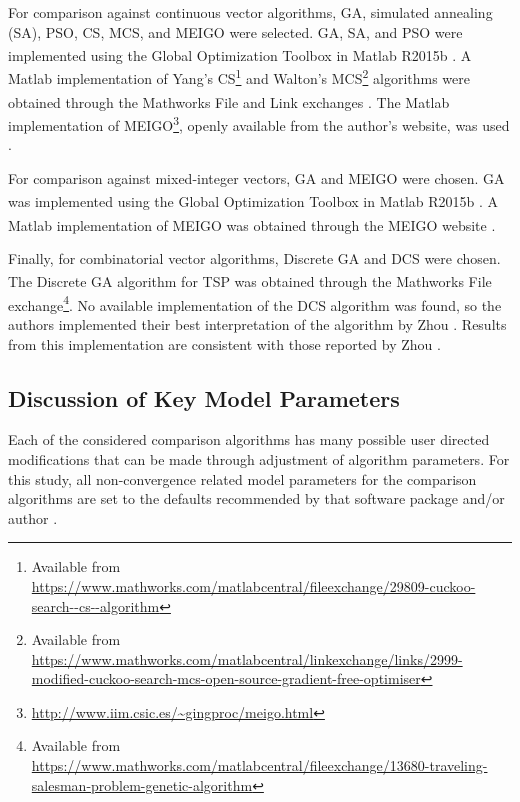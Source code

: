 \documentclass{article}                                                                           %
\begin{document}
For comparison against continuous vector algorithms, GA, simulated annealing (SA), PSO, CS, MCS, and MEIGO were selected.  
GA, SA, and PSO were implemented using the Global Optimization Toolbox in Matlab\textsuperscript{\textregistered} R2015b \cite{Mathworks2015}.
A Matlab\textsuperscript{\textregistered} implementation of Yang's CS\footnote{Available from \url{https://www.mathworks.com/matlabcentral/fileexchange/29809-cuckoo-search--cs--algorithm}} and Walton's MCS\footnote{Available from \url{https://www.mathworks.com/matlabcentral/linkexchange/links/2999-modified-cuckoo-search-mcs-open-source-gradient-free-optimiser}} algorithms were obtained  through the Mathworks\textsuperscript{\textregistered} File and Link exchanges \cite{Yang2009, Walton2011}.
The Matlab\textsuperscript{\textregistered} implementation of MEIGO\footnote{\url{http://www.iim.csic.es/~gingproc/meigo.html}},  openly available from the author's website, was used \cite{Egea2014}.

For comparison against mixed-integer vectors, GA and MEIGO were chosen.
GA was implemented using the Global Optimization Toolbox in Matlab\textsuperscript{\textregistered} R2015b \cite{Mathworks2015}.
A Matlab\textsuperscript{\textregistered} implementation of MEIGO was obtained through the MEIGO website \cite{Egea2014}.

Finally, for combinatorial vector algorithms, Discrete GA and DCS were chosen.
The Discrete GA algorithm for TSP was obtained  through the Mathworks\textsuperscript{\textregistered} File exchange\footnote{Available from \url{https://www.mathworks.com/matlabcentral/fileexchange/13680-traveling-salesman-problem-genetic-algorithm}}.
No available implementation of the DCS algorithm was found, so the authors implemented their best interpretation of the algorithm by Zhou \cite{Zhou2014,Ouyang2013}.  
Results from this implementation are consistent with those reported by Zhou \cite{Zhou2014}.  

\subsection{Discussion of Key Model Parameters} \label{sec:model_params}
Each of the considered comparison algorithms has many possible user directed modifications that can be made through adjustment of algorithm parameters.
For this study, all non-convergence related model parameters for the comparison algorithms are set to the defaults recommended by that software package and/or author \cite{Yang2009, Egea2014, Zhou2014, Walton2011, Mathworks2015}.
\end{document}
